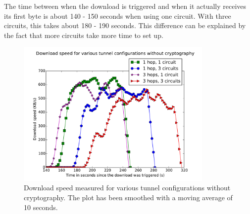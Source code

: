 The time between when the download is triggered and when it actually receives its first byte is about 140 - 150 seconds when using one circuit. With three circuits, this takes about 180 - 190 seconds. This difference can be explained by the fact that more circuits take more time to set up.

\begin{figure}[t]
	\centering
	\includegraphics[width=0.85\textwidth]{graphics/downloadspeed.pdf}
	\caption{Download speed measured for various tunnel configurations without cryptography. The plot has been smoothed with a moving average of 10 seconds.}
	\label{fig:download_measurements}
\end{figure}
